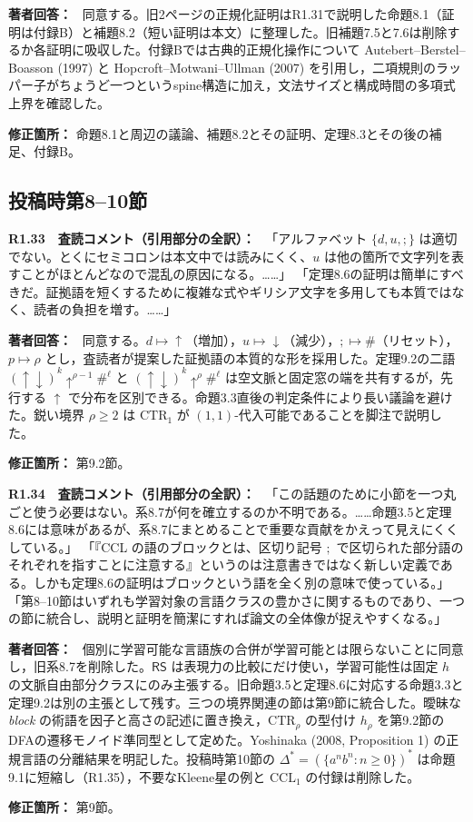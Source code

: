 \documentclass[10pt,a4paper]{ltjsarticle}
\newcommand{\Comment}[1]{\par\medskip\noindent\textbf{#1　査読コメント（引用部分の全訳）：}\ }
\newcommand{\Reply}{\par\noindent\textbf{著者回答：}\ }
\newcommand{\Location}[1]{\par\noindent\textbf{修正箇所：} #1\par}
\newcommand{\RS}{\mathsf{RS}}
\begin{document}
\Reply
同意する。旧2ページの正規化証明はR1.31で説明した命題8.1（証明は付録B）と補題8.2（短い証明は本文）に整理した。旧補題7.5と7.6は削除するか各証明に吸収した。付録Bでは古典的正規化操作について Autebert--Berstel--Boasson (1997) と Hopcroft--Motwani--Ullman (2007) を引用し，二項規則のラッパー子がちょうど一つというspine構造に加え，文法サイズと構成時間の多項式上界を確認した。
\Location{命題8.1と周辺の議論、補題8.2とその証明、定理8.3とその後の補足、付録B。}

\subsection*{投稿時第8--10節}
\Comment{R1.33}
「アルファベット $\{d,u,;\}$ は適切でない。とくにセミコロンは本文中では読みにくく、$u$ は他の箇所で文字列を表すことがほとんどなので混乱の原因になる。……」
「定理8.6の証明は簡単にすべきだ。証拠語を短くするために複雑な式やギリシア文字を多用しても本質ではなく、読者の負担を増す。……」

\Reply
同意する。$d\mapsto\uparrow$（増加），$u\mapsto\downarrow$（減少），$;\mapsto\#$（リセット），$p\mapsto\rho$ とし，査読者が提案した証拠語の本質的な形を採用した。定理9.2の二語 $(\uparrow\downarrow)^k\uparrow^{\rho-1}\#^\ell$ と $(\uparrow\downarrow)^k\uparrow^\rho\#^\ell$ は空文脈と固定窓の端を共有するが，先行する $\uparrow$ で分布を区別できる。命題3.3直後の判定条件により長い議論を避けた。鋭い境界 $\rho\ge2$ は $\mathrm{CTR}_1$ が $(1,1)$-代入可能であることを脚注で説明した。
\Location{第9.2節。}

\Comment{R1.34}
「この話題のために小節を一つ丸ごと使う必要はない。系8.7が何を確立するのか不明である。……命題3.5と定理8.6には意味があるが、系8.7にまとめることで重要な貢献をかえって見えにくくしている。」
「『CCL の語のブロックとは、区切り記号 $;$ で区切られた部分語のそれぞれを指すことに注意する』というのは注意書きではなく新しい定義である。しかも定理8.6の証明はブロックという語を全く別の意味で使っている。」
「第8--10節はいずれも学習対象の言語クラスの豊かさに関するものであり、一つの節に統合し、説明と証明を簡潔にすれば論文の全体像が捉えやすくなる。」

\Reply
個別に学習可能な言語族の合併が学習可能とは限らないことに同意し，旧系8.7を削除した。$\RS$ は表現力の比較にだけ使い，学習可能性は固定 $h$ の文脈自由部分クラスにのみ主張する。旧命題3.5と定理8.6に対応する命題3.3と定理9.2は別の主張として残す。三つの境界関連の節は第9節に統合した。曖昧な \emph{block} の術語を因子と高さの記述に置き換え，$\mathrm{CTR}_\rho$ の型付け $h_\rho$ を第9.2節のDFAの遷移モノイド準同型として定めた。Yoshinaka (2008, Proposition 1) の正規言語の分離結果を明記した。投稿時第10節の $\Delta^*=(\{a^nb^n:n\ge0\})^*$ は命題9.1に短縮し（R1.35），不要なKleene星の例と $\mathrm{CCL}_1$ の付録は削除した。
\Location{第9節。}
\end{document}
